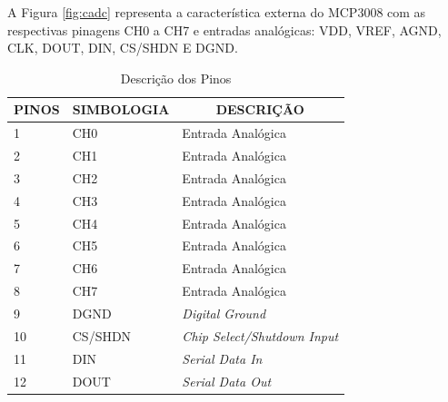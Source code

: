 \documentclass[12pt, a4paper]{article}
\begin{document}
A Figura \ref{fig:cadc} representa a característica externa do MCP3008 com as respectivas pinagens CH0 a CH7 e entradas analógicas: VDD, VREF, AGND, CLK, DOUT, DIN, CS/SHDN E DGND.

\begin{table}[]
\centering
\begin{center}
\caption{Descrição dos Pinos}
\label{center}
\begin{tabular}{|l|l|l|}
\hline
\multicolumn{1}{|c|}{\textbf{PINOS}} & \multicolumn{1}{c|}{\textbf{SIMBOLOGIA}} & \multicolumn{1}{c|}{\textbf{DESCRIÇÃO}} \\ \hline
1                                    & CH0                                      & Entrada Analógica                       \\ \hline
2                                    & CH1                                      & Entrada Analógica                       \\ \hline
3                                    & CH2                                      & Entrada Analógica                       \\ \hline
4                                    & CH3                                      & Entrada Analógica                       \\ \hline
5                                    & CH4                                      & Entrada Analógica                       \\ \hline
6                                    & CH5                                      & Entrada Analógica                       \\ \hline
7                                    & CH6                                      & Entrada Analógica                       \\ \hline
8                                    & CH7                                      & Entrada Analógica                       \\ \hline
9                                    & DGND                                     & \textit{Digital Ground}                 \\ \hline
10                                   & CS/SHDN                                  & \textit{Chip Select/Shutdown Input}     \\ \hline
11                                   & DIN                                      & \textit{Serial Data In}                 \\ \hline
12                                   & DOUT                                     & \textit{Serial Data Out}                \\ \hline

\end{tabular}
\end{center}
\end{table}
\end{document}
